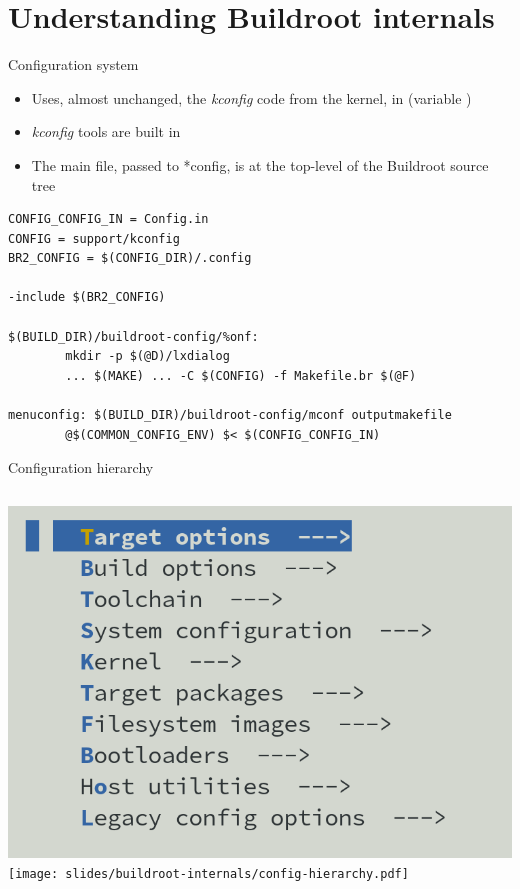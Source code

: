 \section{Understanding Buildroot internals}

\begin{frame}[fragile]{Configuration system}
  \begin{itemize}
  \item Uses, almost unchanged, the {\em kconfig} code from the
    kernel, in  (variable )
  \item {\em kconfig} tools are built in
  \item The main  file, passed to *config, is at the
    top-level of the Buildroot source tree
  \end{itemize}
\begin{block}{}
\begin{verbatim}
CONFIG_CONFIG_IN = Config.in
CONFIG = support/kconfig
BR2_CONFIG = $(CONFIG_DIR)/.config

-include $(BR2_CONFIG)

$(BUILD_DIR)/buildroot-config/%onf:
        mkdir -p $(@D)/lxdialog
        ... $(MAKE) ... -C $(CONFIG) -f Makefile.br $(@F)

menuconfig: $(BUILD_DIR)/buildroot-config/mconf outputmakefile
        @$(COMMON_CONFIG_ENV) $< $(CONFIG_CONFIG_IN)
\end{verbatim}
\end{block}
\end{frame}

\begin{frame}{Configuration hierarchy}
  \begin{columns}
    \includegraphics[width=\textwidth]{slides/buildroot-internals/menuconfig-toplevel.png}
    \texttt{[image: slides/buildroot-internals/config-hierarchy.pdf]}
  \end{columns}
\end{frame}

